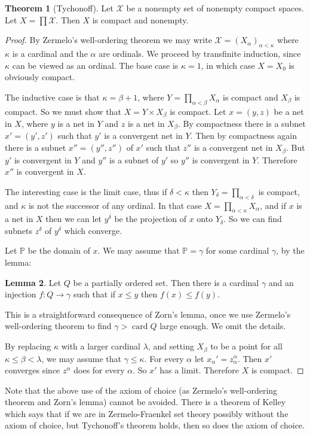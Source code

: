 \documentclass[12pt]{book}
\newcommand{\PP}{\mathbb{P}}
\DeclareMathOperator{\card}{card}
\theoremstyle{definition}
\newtheorem{theorem}{Theorem}[section]
\newtheorem{lemma}[theorem]{Lemma}
\begin{document}
\begin{theorem}[Tychonoff]
Let $\mathcal X$ be a nonempty set of nonempty compact spaces. Let $X = \prod \mathcal X$. Then $X$ is compact and nonempty.
\end{theorem}
\begin{proof}
By Zermelo's well-ordering theorem we may write $\mathcal X = (X_\alpha)_{\alpha < \kappa}$ where $\kappa$ is a cardinal and the $\alpha$ are ordinals.
We proceed by transfinite induction, since $\kappa$ can be viewed as an ordinal.
The base case is $\kappa = 1$, in which case $X = X_0$ is obviously compact.

The inductive case is that $\kappa = \beta + 1$, where $Y = \prod_{\alpha < \beta} X_\alpha$ is compact and $X_\beta$ is compact.
So we must show that $X = Y \times X_\beta$ is compact.
Let $x = (y, z)$ be a net in $X$, where $y$ is a net in $Y$ and $z$ is a net in $X_\beta$.
By compactness there is a subnet $x' = (y', z')$ such that $y'$ is a convergent net in $Y$.
Then by compactness again there is a subnet $x'' = (y'', z'')$ of $x'$ such that $z''$ is a convergent net in $X_\beta$.
But $y'$ is convergent in $Y$ and $y''$ is a subnet of $y'$ so $y''$ is convergent in $Y$.
Therefore $x''$ is convergent in $X$.

The interesting case is the limit case, thus if $\delta < \kappa$ then $Y_\delta = \prod_{\alpha < \delta}$ is compact, and $\kappa$ is not the successor of any ordinal.
In that case $X = \prod_{\alpha < \kappa} X_\alpha$, and if $x$ is a net in $X$ then we can let $y^\delta$ be the projection of $x$ onto $Y_\delta$.
So we can find subnets $z^\delta$ of $y^\delta$ which converge.

Let $\PP$ be the domain of $x$. We may assume that $\PP = \gamma$ for some cardinal $\gamma$, by the lemma:
\begin{lemma}
Let $Q$ be a partially ordered set. Then there is a cardinal $\gamma$ and an injection $f: Q \to \gamma$ such that if $x \leq y$ then $f(x) \leq f(y)$.
\end{lemma}
This is a straightforward consequence of Zorn's lemma, once we use Zermelo's well-ordering theorem to find $\gamma > \card Q$ large enough.
We omit the details.

By replacing $\kappa$ with a larger cardinal $\lambda$, and setting $X_\beta$ to be a point for all $\kappa \leq \beta < \lambda$, we may assume that $\gamma \leq \kappa$.
For every $\alpha$ let $x_\alpha' = z^\alpha_\alpha$.
Then $x'$ converges since $z^\alpha$ does for every $\alpha$.
So $x'$ has a limit. Therefore $X$ is compact.
\end{proof}

Note that the above use of the axiom of choice (as Zermelo's well-ordering theorem and Zorn's lemma) cannot be avoided. There is a theorem of Kelley which says that if we are in Zermelo-Fraenkel set theory possibly without the axiom of choice, but Tychonoff's theorem holds, then so does the axiom of choice.


\newpage
\printindex
\printbibliography
\end{document}
